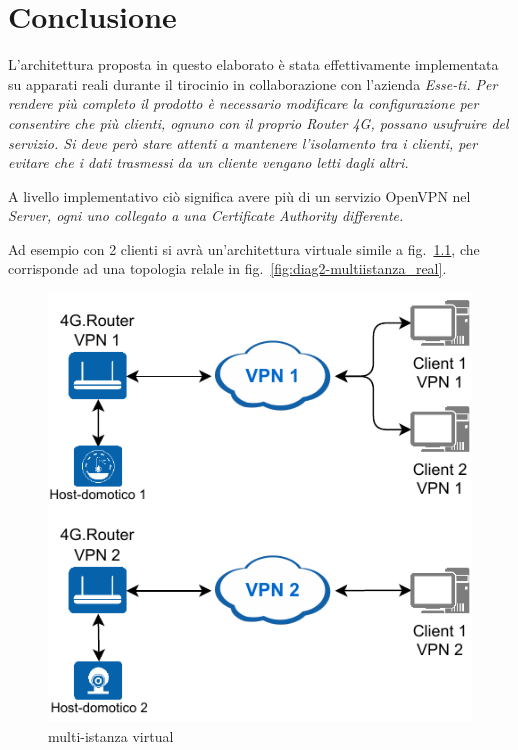 \chapter{Conclusione \workinprogress}

L'architettura proposta in questo elaborato è stata effettivamente implementata su apparati reali durante il tirocinio in collaborazione con l'azienda \it{Esse-ti}. Per rendere più completo il prodotto è necessario modificare la configurazione per consentire che più clienti, ognuno con il proprio Router 4G, possano usufruire del servizio. Si deve però stare attenti a mantenere l'isolamento tra i clienti, per evitare che i dati trasmessi da un cliente vengano letti dagli altri.

A livello implementativo ciò significa avere più di un servizio OpenVPN nel \it{Server}, ogni uno collegato a una \it{Certificate Authority} differente.

Ad esempio con 2 clienti si avrà un'architettura virtuale simile a fig.~\ref{fig:diag2-multiistanza_virtual}, che corrisponde ad una topologia relale in fig.~\ref{fig:diag2-multiistanza_real}.

\begin{figure}[h]
    \centering
    \includegraphics[width=0.6\linewidth]{immagini/diag2-multiistanza_virtual}
    \caption{multi-istanza virtual}
    \label{fig:diag2-multiistanza_virtual}
\end{figure}


